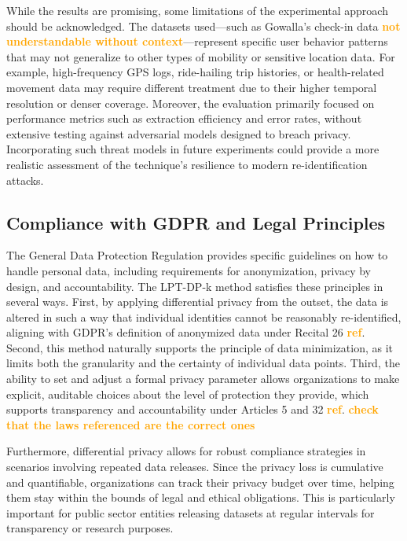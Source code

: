 \documentclass[twocolumn]{article}
\newcommand{\later}[1]{\textbf{\textcolor{orange}{#1}}}
\begin{document}
While the results are promising, some limitations of the experimental approach should be acknowledged. The datasets used—such as Gowalla's check-in data \later{not understandable without context}—represent specific user behavior patterns that may not generalize to other types of mobility or sensitive location data. For example, high-frequency GPS logs, ride-hailing trip histories, or health-related movement data may require different treatment due to their higher temporal resolution or denser coverage. Moreover, the evaluation primarily focused on performance metrics such as extraction efficiency and error rates, without extensive testing against adversarial models designed to breach privacy. Incorporating such threat models in future experiments could provide a more realistic assessment of the technique's resilience to modern re-identification attacks.




\subsection{Compliance with GDPR and Legal Principles}
The General Data Protection Regulation provides specific guidelines on how to handle personal data, including requirements for anonymization, privacy by design, and accountability. The LPT-DP-k method satisfies these principles in several ways. First, by applying differential privacy from the outset, the data is altered in such a way that individual identities cannot be reasonably re-identified, aligning with GDPR’s definition of anonymized data under Recital 26 \later{ref}. Second, this method naturally supports the principle of data minimization, as it limits both the granularity and the certainty of individual data points. Third, the ability to set and adjust a formal privacy parameter allows organizations to make explicit, auditable choices about the level of protection they provide, which supports transparency and accountability under Articles 5 and 32 \later{ref}. \later{check that the laws referenced are the correct ones}

Furthermore, differential privacy allows for robust compliance strategies in scenarios involving repeated data releases. Since the privacy loss is cumulative and quantifiable, organizations can track their privacy budget over time, helping them stay within the bounds of legal and ethical obligations. This is particularly important for public sector entities releasing datasets at regular intervals for transparency or research purposes.
\end{document}

